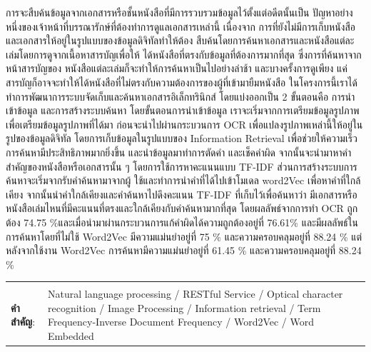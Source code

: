 \documentclass[12pt,oneside,openright,a4paper]{cpe-thai-project}
\begin{document}
\thaiabstract

การจะสืบค้นข้อมูลจากเอกสารหรือชั้นหนังสือที่มีการรวบรวมข้อมูลไว้ตั้งแต่อดีตนั้นเป็น
ปัญหาอย่างหนึ่งของเจ้าหน้าที่บรรณารักษ์ที่ต้องทำการดูแลเอกสารเหล่านี้ เนื่องจาก
การที่ยังไม่มีการเก็บหนังสือและเอกสารให้อยู่ในรูปแบบของข้อมูลดิจิทัลทำให้ต้อง
สืบค้นโดยการค้นหาเอกสารและหนังสือแต่ละเล่มโดยการดูจากเนื้อหาสารบัญเพื่อให้
ได้หนังสือที่ตรงกับข้อมูลที่ต้องการมากที่สุด ซึ่งการที่ค้นหาจากหน้าสารบัญของ
หนังสือแต่ละเล่มก็จะทำให้การค้นหาเป็นไปอย่างล่าช้า และบางครั้งการดูเพียง
แค่สารบัญก็อาจจะทำให้ได้หนังสือที่ไม่ตรงกับความต้องการของผู้ที่เข้ามายืมหนังสือ 
ในโครงการนี้เราได้ทำการพัฒนาการระบบจัดเก็บและค้นหาเอกสารอิเล็กทรินิกส์ 
โดยแบ่งออกเป็น 2 ขั้นตอนคือ การนำเข้าข้อมูล  และการสร้างระบบค้นหา 
โดยขั้นตอนการนำเข้าข้อมูล เราจะเริ่มจากการเตรียมข้อมูลรูปภาพ
เพื่อเตรียมข้อมูลรูปภาพที่ได้มา ก่อนจะนำไปผ่านกระบวนการ OCR 
เพื่อแปลงรูปภาพเหล่านี้ให้อยู่ในรูปของข้อมูลดิจิทัล โดยการเก็บข้อมูลในรูปแบบของ 
Information Retrieval เพื่อช่วยให้ความเร็วการค้นหามีประสิทธิภาพมากยิ่งขึ้น 
และนำข้อมูลมาทำการตัดคำ และเช็คคำผิด จากนั้นจะนำมาหาคำสำคัญของหนังสือหรือเอกสารนั้น ๆ
โดยการใช้การหาคะแนนแบบ TF-IDF ส่วนการสร้างระบบการค้นหาจะเริ่มจากรับคำค้นหามาจากผู้
ใช้และทำการนำคำที่ได้ไปเข้าโมเดล word2Vec เพื่อหาคำที่ใกล้เคียง 
จากนั้นนำคำใกล้เคียงและคำค้นหาไปดึงคะแนน TF-IDF ที่เก็บไว้เพื่อค้นหาว่า
มีเอกสารหรือหนังสือเล่มไหนที่มีคะแนนที่ตรงและใกล้เคียงกับคำค้นหามากที่สุด
โดยผลลัพธ์จากการทำ OCR ถูกต้อง 74.75 \%และเมื่อนำมาผ่านกระบวนการแก้คำผิดได้ความถูกต้องอยู่ที่ 76.61\%
และมีผลลัพธ์ในการค้นหาโดยที่ไม่ใช้ Word2Vec มีความแม่นยำอยู่ที่ 75 \% และความครอบคลุมอยู่ที่ 88.24 \% 
แต่หลังจากใช้งาน Word2Vec การค้นหามีความแม่นยำอยู่ที่ 61.45 \% และความครอบคลุมอยู่ที่ 88.24 \%
\begin{flushleft}
\begin{tabular*}{\textwidth}{@{}lp{}}
 & \\

\textbf{คำสำคัญ}: & Natural language processing / RESTful Service / Optical character recognition / Image Processing / Information retrieval / Term Frequency-Inverse Document Frequency / Word2Vec / Word Embedded 
\end{tabular*}
\end{flushleft}
\endabstract
\end{document}
